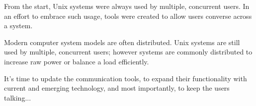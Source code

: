 
From the start, Unix systems were always used by multiple, concurrent
users. In an effort to embrace such usage, tools were created to
allow users converse across a system.


Modern computer system models are often distributed. Unix systems are
still used by multiple, concurrent users; however systems are commonly
distributed to increase raw power or balance a load efficiently. 


It's time to update the communication tools, to expand their
functionality with current and emerging technology, and most
importantly, to keep the users talking...
